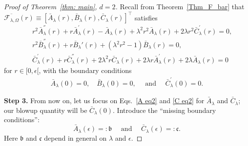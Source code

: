 \documentclass[11pt,a4paper,english,reqno]{amsart}
\theoremstyle{plain}
\newcommand{\e}{\epsilon}
\newcommand{\1}{\mathbbm{1}}
\newcommand{\bb}{{\mathfrak{b}}}
\begin{document}
\begin{proof}[Proof of Theorem~\ref{thm: main}, $d=2$]
Recall from Theorem~\ref{Thm_F_bar} that 
$\overline{\mathcal{F}_{\lambda,\Omega}}(r) \equiv \left[\bar{A}_\lambda(r),\bar{B}_{\lambda}(r), \bar{C}_{\lambda}(r)\right]^\top$ satisfies
\begin{eqnarray}
&&r^{2}\bar{A}_{\lambda}^{''}(r) + r\bar{A}_{\lambda}^{'}(r) -\bar{A}_{\lambda}(r) + \lambda^{2}r^{2}\bar{A}_{\lambda}(r) + 2\lambda r^{2}\bar{C}_{\lambda}^{'}(r) = 0,\label{A eq2}\\
&&r^2\bar{B}_{\lambda}^{''}(r) + r\bar{B}_{\lambda}'(r) + (\lambda^2r^2-1)\bar{B}_{\lambda}(r)= 0,\label{B eq2}\\
&&\bar{C}^{'}_{\lambda}(r) + r\bar{C}^{''}_{\lambda}(r) + 2\lambda^{2}r\bar{C}_{\lambda}(r) + 2\lambda r \bar{A}^{'}_{\lambda}(r) + 2\lambda \bar{A}_{\lambda}(r)= 0\label{C eq2}
\end{eqnarray}
for $r \in [0,\e[$, with the boundary conditions
\begin{align}\label{boundary conditions, ABC, reproduced}
\bar{A}_{\lambda}(0) = 0,\quad\bar{B}_{\lambda}(0) = 0,\quad \text{ and }\quad  \bar{C}^{'}_{\lambda}(0) = 0.
\end{align}  

\smallskip
\noindent
{\bf Step 3.} From now on, let us focus on Eqs.~\eqref{A eq2} and \eqref{C eq2} for $\bar{A}_\lambda$ and $\bar{C}_\lambda$; our blowup quantity will  be  $\bar{C}_\lambda(0)$. Introduce the ``missing boundary conditions'':
\begin{equation}\label{missing bc}
\bar{A}_\lambda(\e) =: \bb \quad\text{ and } \quad \bar{C}_\lambda(\e) =:\mathfrak{c}.     
\end{equation}
Here $\bb$ and $\mathfrak{c}$ depend in general on $\lambda$ and $\e$. 









\end{proof}
\end{document}
